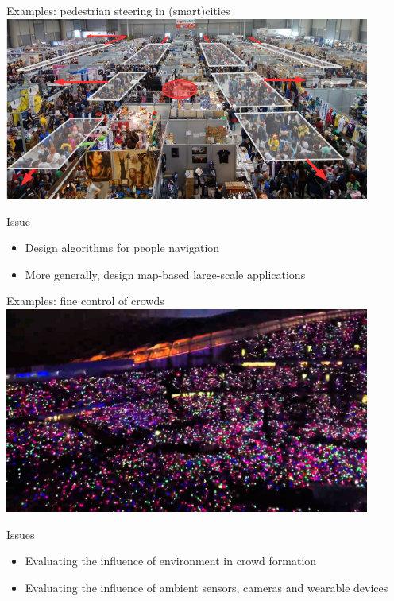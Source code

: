 \documentclass[presentation, 9pt]{beamer}\mode<presentation>{\usetheme{AMSBolognaFC}}
\begin{document}
\begin{frame}{Examples: pedestrian steering in (smart)cities}
\includegraphics[width=0.9\textwidth]{img/pedastrian.png}
\begin{alertblock}{Issue}
	\begin{itemize}
		\item Design  algorithms for people navigation
		\item More generally, design map-based large-scale applications
	\end{itemize}
\end{alertblock}
\end{frame}
\begin{frame}{Examples: fine control of crowds}
\centering
\includegraphics[width=0.9\textwidth]{img/coldplay}
\begin{alertblock}{Issues}
	\begin{itemize}
		\item Evaluating the influence of environment in crowd formation
		\item Evaluating the influence of ambient sensors, cameras and wearable
		devices
	\end{itemize}
\end{alertblock}
\end{frame}
\end{document}

